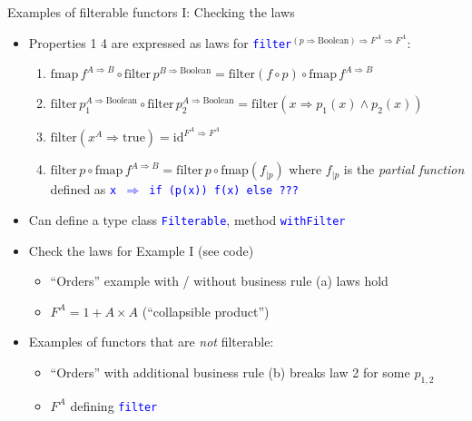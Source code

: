 \documentclass[english]{beamer}
\begin{document}
\begin{frame}{Examples of filterable functors I: Checking the laws}

\begin{itemize}
\item Properties 1 \textendash{} 4 are expressed as laws for \texttt{\textcolor{blue}{\footnotesize{}filter}}$^{(p\Rightarrow\text{Boolean})\Rightarrow F^{A}\Rightarrow F^{A}}$:
\begin{enumerate}
\item {\footnotesize{}$\text{fmap}\,f^{A\Rightarrow B}\circ\text{filter}\,p^{B\Rightarrow\text{Boolean}}=\text{filter}\left(f\circ p\right)\circ\text{fmap}\,f^{A\Rightarrow B}$}{\footnotesize \par}
\item {\footnotesize{}$\text{filter}\,p_{1}^{A\Rightarrow\text{Boolean}}\circ\text{filter}\,p_{2}^{A\Rightarrow\text{Boolean}}=\text{filter}\left(x\Rightarrow p_{1}(x)\wedge p_{2}(x)\right)$}{\footnotesize \par}
\item {\footnotesize{}$\text{filter}\left(x^{A}\Rightarrow\text{true}\right)=\text{id}^{F^{A}\Rightarrow F^{A}}$ }{\footnotesize \par}
\item {\footnotesize{}$\text{filter}\,p\circ\text{fmap}\,f^{A\Rightarrow B}=\text{filter}\,p\circ\text{fmap}\left(f_{|p}\right)$
}where {\footnotesize{}$f_{|p}$} is the \emph{partial function} defined
as \texttt{\textcolor{blue}{\footnotesize{}x $\Rightarrow$ if (p(x))
f(x) else ???}} 
\end{enumerate}
\item Can define a type class \texttt{\textcolor{blue}{\footnotesize{}Filterable}},
method \texttt{\textcolor{blue}{\footnotesize{}withFilter}} 
\item Check the laws for Example I (see code)
\begin{itemize}
\item ``Orders'' example with / without business rule (a) \textendash{}
laws hold
\item $F^{A}=1+A\times A$ (``collapsible product'')
\end{itemize}
\item Examples of functors that are \emph{not} filterable:
\begin{itemize}
\item ``Orders'' with additional business rule (b) \textendash{} breaks
law 2 for some $p_{1,2}$
\item $F^{A}$ defining \texttt{\textcolor{blue}{\footnotesize{}filter}}

\end{itemize}
\end{itemize}
\end{frame}
\end{document}
